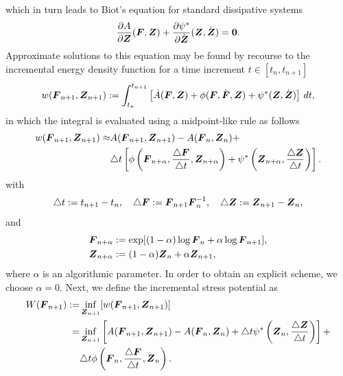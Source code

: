 \documentclass[12pt]{article}
\numberwithin{equation}{section}
\begin{document}
which in turn leads to Biot's equation for standard dissipative systems
\begin{equation} \label{eq:Biots-equation}
  \frac{\partial A}{\partial {\boldsymbol{Z}}} ({\boldsymbol{F}}, {\boldsymbol{Z}})
  +
  \frac{\partial \psi^*}{\partial \dot{{\boldsymbol{Z}}}} ({\boldsymbol{Z}}, \dot{{\boldsymbol{Z}}})
  =
  \mathbf{0}.
\end{equation}
Approximate solutions to this equation may be found by recourse to the
incremental energy density function for a time increment $t \in [t_n,
t_{n+1}]$
\begin{equation} \label{incremental-energy-density}
  w({\boldsymbol{F}}_{n+1}, {\boldsymbol{Z}}_{n+1}) := 
  \int_{t_n}^{t_{n+1}}
  \left[
    \dot{A}({\boldsymbol{F}}, {\boldsymbol{Z}})
    +
    \phi({\boldsymbol{F}}, \dot{{\boldsymbol{F}}}, {\boldsymbol{Z}})
    +
    \psi^*({\boldsymbol{Z}}, \dot{{\boldsymbol{Z}}})
  \right]
  \, dt,
\end{equation}
in which the integral is evaluated using a midpoint-like rule
as follows
\begin{equation} \label{incremental-energy-density-mid-point}
  \begin{split}
    w({\boldsymbol{F}}_{n+1}, {\boldsymbol{Z}}_{n+1}) \approx
    &
    A({\boldsymbol{F}}_{n+1}, {\boldsymbol{Z}}_{n+1}) - A({\boldsymbol{F}}_n, {\boldsymbol{Z}}_n) +
    \\
    &
    \triangle t
    \left[
      \phi
      \left(
        {\boldsymbol{F}}_{n+\alpha}, \frac{\triangle {\boldsymbol{F}}}{\triangle t}, {\boldsymbol{Z}}_{n+\alpha}
      \right)
      +
      \psi^*
      \left(
        {\boldsymbol{Z}}_{n+\alpha}, \frac{\triangle {\boldsymbol{Z}}}{\triangle t}
      \right)
    \right].
  \end{split}
\end{equation}
with
\begin{equation} \label{eq:increments}
  \triangle t := t_{n+1} - t_n,
  \quad
  \triangle {\boldsymbol{F}} := {\boldsymbol{F}}_{n+1} {\boldsymbol{F}}_n^{-1},
  \quad
  \triangle {\boldsymbol{Z}} := {\boldsymbol{Z}}_{n+1} - {\boldsymbol{Z}}_n,
\end{equation}
and
\begin{equation} \label{eq:mid-values}
  \begin{split}
    {\boldsymbol{F}}_{n+\alpha} & := \exp[(1 - \alpha) \log {\boldsymbol{F}}_n + \alpha \log {\boldsymbol{F}}_{n+1}],
    \\
    {\boldsymbol{Z}}_{n+\alpha} & := (1 - \alpha) {\boldsymbol{Z}}_n + \alpha {\boldsymbol{Z}}_{n+1},
  \end{split}
\end{equation}
where $\alpha$ is an algorithmic parameter. In order to obtain an
explicit scheme, we choose $\alpha = 0$. Next, we define the
incremental stress potential as
\begin{equation} \label{eq:incremental-stress-potential}
  \begin{split}
    W({\boldsymbol{F}}_{n+1})
    :=
    &
    \inf_{{\boldsymbol{Z}}_{n+1}}[w({\boldsymbol{F}}_{n+1}, {\boldsymbol{Z}}_{n+1})]
    \\
    =
    &
    \inf_{{\boldsymbol{Z}}_{n+1}}
    \left[
      A({\boldsymbol{F}}_{n+1}, {\boldsymbol{Z}}_{n+1}) - A({\boldsymbol{F}}_n, {\boldsymbol{Z}}_n)
      +
      \triangle t
      \psi^*\left({\boldsymbol{Z}}_n, \frac{\triangle {\boldsymbol{Z}}}{\triangle t}\right)
    \right]
    +
    \\
    &
    \triangle t
    \phi\left({\boldsymbol{F}}_n, \frac{\triangle {\boldsymbol{F}}}{\triangle t}, {\boldsymbol{Z}}_n\right).
  \end{split}
\end{equation}
\end{document}
